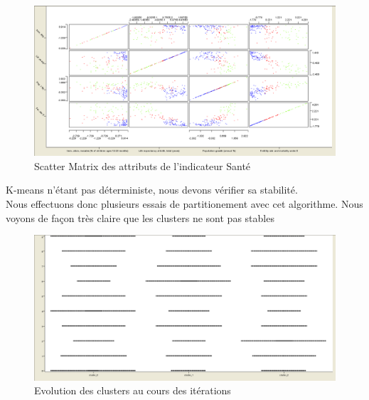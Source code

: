 \begin{figure}[H]
	\begin{center}
		\includegraphics[scale=0.5]{Image/scattermatrixSantekmeansNoMissing2}
		\caption{Scatter Matrix des attributs de l'indicateur Santé \jeuc}
	\end{center}
\end{figure}

K-means n'étant pas déterministe, nous devons vérifier sa stabilité.\\
Nous effectuons donc plusieurs essais de partitionement avec cet algorithme. Nous voyons de façon très claire que les clusters ne sont pas stables  
\begin{figure}[H]
	\begin{center}
		\includegraphics[scale=0.4]{Image/ScatterPlotSanteKmeansStabiliteNoMissing2}
		\caption{Evolution des clusters au cours des itérations}
	\end{center}
\end{figure}



